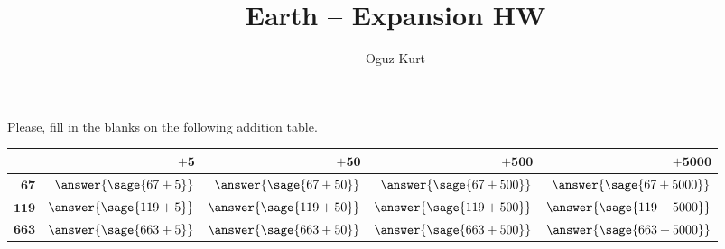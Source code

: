 \documentclass{ximera}
\title{Earth -- Expansion HW \hfill \makebox[0.5\textwidth]{Name:\enspace\hrulefill}}
\author{Oguz Kurt}
\begin{document}
\begin{abstract}
\empty
\end{abstract}
\begin{problem}
Please, fill in the blanks on the following addition table.
\begin{center}
\setlength\extrarowheight{12pt}
\begin{tabular}[c]{|r|r|r|r|r|}
\hline
&~~~~~~~ $\mathbf{+5}$ &~~~~~ $\mathbf{+50}$ &~~~~ $\mathbf{+500}$ &~~~ $\mathbf{+5000}$ 
\\ 
\hline
$\mathbf{67}$ &$\answer{\sage{67+5}}$&$\answer{\sage{67+50}}$&$\answer{\sage{67+500}}$&$\answer{\sage{67+5000}}$ 
\\
\hline
$\mathbf{119}$ &$\answer{\sage{119+5}}$&$\answer{\sage{119+50}}$&$\answer{\sage{119+500}}$&$\answer{\sage{119+5000}}$ 
\\
\hline
$\mathbf{663}$ &$\answer{\sage{663+5}}$&$\answer{\sage{663+50}}$&$\answer{\sage{663+500}}$&$\answer{\sage{663+5000}}$ 
\\
\hline
\end{tabular}
\end{center}
\end{problem}
\end{document}
